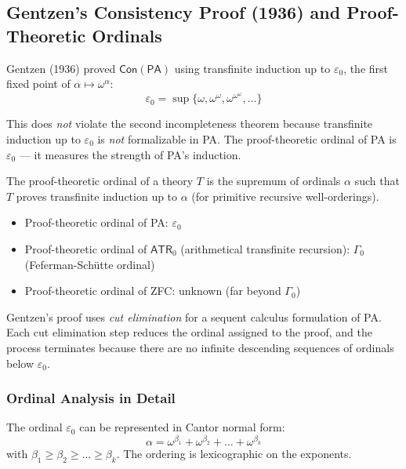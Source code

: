 \subsection{Gentzen's Consistency Proof (1936) and Proof-Theoretic Ordinals}
\label{sec:godel:gentzen}

Gentzen (1936) proved $\mathsf{Con}(\mathsf{PA})$ using transfinite induction up to $\varepsilon_0$, the first fixed point of $\alpha \mapsto \omega^\alpha$:
\[
\varepsilon_0 = \sup \{ \omega, \omega^\omega, \omega^{\omega^\omega}, \dots \}
\]

This does \emph{not} violate the second incompleteness theorem because transfinite induction up to $\varepsilon_0$ is \emph{not} formalizable in PA. The proof-theoretic ordinal of PA is $\varepsilon_0$ --- it measures the strength of PA's induction.

\begin{definition}
The proof-theoretic ordinal of a theory $T$ is the supremum of ordinals $\alpha$ such that $T$ proves transfinite induction up to $\alpha$ (for primitive recursive well-orderings).
\end{definition}

\begin{itemize}
\item Proof-theoretic ordinal of PA: $\varepsilon_0$
\item Proof-theoretic ordinal of $\mathsf{ATR}_0$ (arithmetical transfinite recursion): $\Gamma_0$ (Feferman-Schütte ordinal)
\item Proof-theoretic ordinal of ZFC: unknown (far beyond $\Gamma_0$)
\end{itemize}

Gentzen's proof uses \emph{cut elimination} for a sequent calculus formulation of PA. Each cut elimination step reduces the ordinal assigned to the proof, and the process terminates because there are no infinite descending sequences of ordinals below $\varepsilon_0$.

\subsubsection*{Ordinal Analysis in Detail}

The ordinal $\varepsilon_0$ can be represented in Cantor normal form:
\[
\alpha = \omega^{\beta_1} + \omega^{\beta_2} + \dots + \omega^{\beta_k}
\]
with $\beta_1 \ge \beta_2 \ge \dots \ge \beta_k$. The ordering is lexicographic on the exponents.


